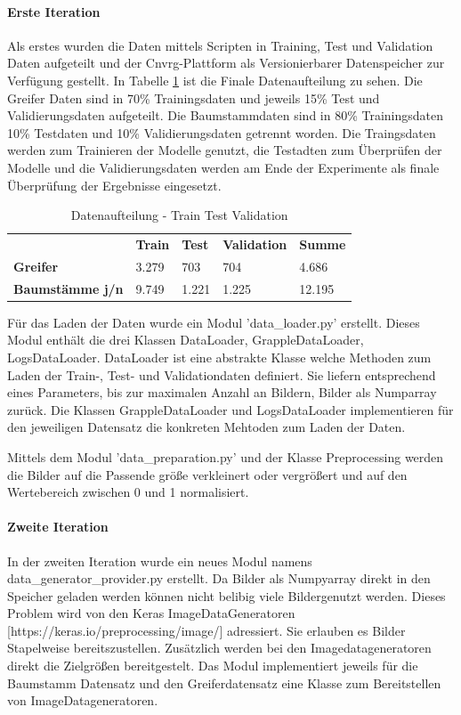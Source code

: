 	\paragraph{Erste Iteration}  Als erstes wurden die Daten mittels Scripten in Training, Test und Validation Daten aufgeteilt und  der Cnvrg-Plattform als Versionierbarer Datenspeicher zur Verfügung gestellt. In Tabelle \ref{table:DatenaufteilungTrainTestValidation} ist die Finale Datenaufteilung zu sehen. Die Greifer Daten sind in 70\% Trainingsdaten und jeweils 15\% Test und Validierungsdaten aufgeteilt. Die Baumstammdaten sind in 80\% Trainingsdaten 10\% Testdaten und 10\% Validierungsdaten getrennt worden. 	Die Traingsdaten werden zum Trainieren der Modelle genutzt, die Testadten zum Überprüfen der Modelle und die Validierungsdaten werden am Ende der Experimente als finale Überprüfung der Ergebnisse eingesetzt.
	\begin{table}[ht]
		\centering
		\begin{tabularx}{\textwidth}{lllll}
			& \textbf{Train} & \textbf{Test}  & \textbf{Validation} & \textbf{Summe} 	 \\
			\textbf{Greifer} 				 & 	3.279			& 703	 & 704				   & 4.686 	\\
			\textbf{Baumstämme j/n}	 	  &  9.749	   & 1.221 	& 1.225	& 12.195\\		
		\end{tabularx}
		\caption{Datenaufteilung - Train Test Validation}
		\label{table:DatenaufteilungTrainTestValidation}
	\end{table}
	
	Für das Laden der Daten wurde ein Modul 'data\_loader.py' erstellt. Dieses Modul enthält die drei Klassen DataLoader, GrappleDataLoader, LogsDataLoader. DataLoader ist eine abstrakte Klasse welche Methoden zum Laden der Train-, Test- und Validationdaten definiert. Sie liefern entsprechend eines Parameters, bis zur maximalen Anzahl an Bildern, Bilder als Numparray zurück. Die Klassen GrappleDataLoader und LogsDataLoader implementieren für den jeweiligen Datensatz die konkreten Mehtoden zum Laden der Daten.
	
	Mittels dem Modul 'data\_preparation.py' und der Klasse Preprocessing werden die Bilder auf die Passende größe verkleinert oder vergrößert und auf den Wertebereich zwischen 0 und 1 normalisiert.
	
	\paragraph{Zweite Iteration} 
	In der zweiten Iteration wurde ein neues Modul namens data\_generator\_provider.py erstellt. Da Bilder als Numpyarray direkt in den Speicher geladen werden können nicht belibig viele Bildergenutzt werden. Dieses Problem wird von den Keras ImageDataGeneratoren [https://keras.io/preprocessing/image/] adressiert. Sie erlauben es Bilder Stapelweise bereitszustellen. Zusätzlich werden bei den Imagedatageneratoren direkt die Zielgrößen bereitgestelt. Das Modul implementiert jeweils für die Baumstamm Datensatz und den Greiferdatensatz eine Klasse zum Bereitstellen von ImageDatageneratoren.
	
